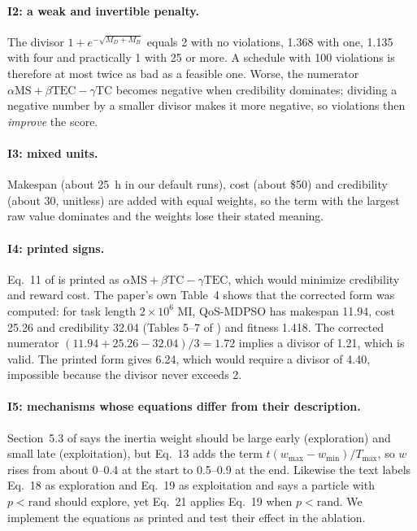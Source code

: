 \documentclass[pdflatex,sn-basic]{sn-jnl}
\theoremstyle{thmstyleone}%
\theoremstyle{thmstyletwo}%
\theoremstyle{thmstylethree}%
\begin{document}
\paragraph{I2: a weak and invertible penalty.} The divisor $1+e^{-\sqrt{M_D+M_B}}$ equals 2 with no violations, 1.368 with one, 1.135 with four and practically 1 with 25 or more. A schedule with 100 violations is therefore at most twice as bad as a feasible one. Worse, the numerator $\alpha\mathrm{MS}+\beta\mathrm{TEC}-\gamma\mathrm{TC}$ becomes negative when credibility dominates; dividing a negative number by a smaller divisor makes it more negative, so violations then \emph{improve} the score.

\paragraph{I3: mixed units.} Makespan (about 25~h in our default runs), cost (about \$50) and credibility (about 30, unitless) are added with equal weights, so the term with the largest raw value dominates and the weights lose their stated meaning.

\paragraph{I4: printed signs.} Eq.~11 of \citet{ouyang2025} is printed as $\alpha\mathrm{MS}+\beta\mathrm{TC}-\gamma\mathrm{TEC}$, which would minimize credibility and reward cost. The paper's own Table~4 shows that the corrected form was computed: for task length $2\times10^{6}$ MI, QoS-MDPSO has makespan 11.94, cost 25.26 and credibility 32.04 (Tables 5--7 of \citet{ouyang2025}) and fitness 1.418. The corrected numerator $(11.94+25.26-32.04)/3=1.72$ implies a divisor of 1.21, which is valid. The printed form gives 6.24, which would require a divisor of 4.40, impossible because the divisor never exceeds 2.

\paragraph{I5: mechanisms whose equations differ from their description.} Section~5.3 of \citet{ouyang2025} says the inertia weight should be large early (exploration) and small late (exploitation), but Eq.~13 adds the term $t(w_{\max}-w_{\min})/T_{\max}$, so $w$ rises from about 0--0.4 at the start to 0.5--0.9 at the end. Likewise the text labels Eq.~18 as exploration and Eq.~19 as exploitation and says a particle with $p<\mathrm{rand}$ should explore, yet Eq.~21 applies Eq.~19 when $p<\mathrm{rand}$. We implement the equations as printed and test their effect in the ablation.
\end{document}
